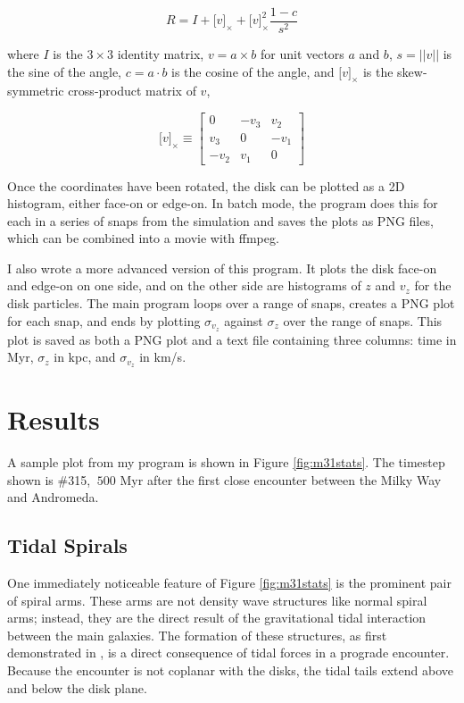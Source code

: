 \documentclass[iop]{emulateapj}
\begin{document}
\begin{equation}
R = I + {\lbrack v \rbrack}_\times + {\lbrack v \rbrack}_\times^2 \frac{1-c}{s^2}
\end{equation}

where $I$ is the $3\times3$ identity matrix, $v = a \times b$ for unit vectors $a$ and $b$, $s = ||v||$ is the sine of the angle, $c = a \cdot b$ is the cosine of the angle, and ${\lbrack v \rbrack}_\times$ is the skew-symmetric cross-product matrix of $v$,

\[
{\lbrack v \rbrack}_\times \equiv \left[ \begin{array}{ccc}
0 & -v_3 & v_2 \\
v_3 & 0 & -v_1 \\
-v_2 & v_1 & 0 \end{array} \right]
\]

Once the coordinates have been rotated, the disk can be plotted as a 2D histogram, either face-on or edge-on. In batch mode, the program does this for each in a series of snaps from the simulation and saves the plots as PNG files, which can be combined into a movie with ffmpeg.

I also wrote a more advanced version of this program. It plots the disk face-on and edge-on on one side, and on the other side are histograms of $z$ and $v_z$ for the disk particles. The main program loops over a range of snaps, creates a PNG plot for each snap, and ends by plotting $\sigma_{v_z}$ against $\sigma_z$ over the range of snaps. This plot is saved as both a PNG plot and a text file containing three columns: time in Myr, $\sigma_z$ in kpc, and $\sigma_{v_z}$ in km/s.

\section{Results}
A sample plot from my program is shown in Figure \ref{fig:m31stats}. The timestep shown is \#315, $~500$ Myr after the first close encounter between the Milky Way and Andromeda.

\subsection{Tidal Spirals}
One immediately noticeable feature of Figure \ref{fig:m31stats} is the prominent pair of spiral arms. These arms are not density wave structures like normal spiral arms; instead, they are the direct result of the gravitational tidal interaction between the main galaxies. The formation of these structures, as first demonstrated in \citet{Too72}, is a direct consequence of tidal forces in a prograde encounter. Because the encounter is not coplanar with the disks, the tidal tails extend above and below the disk plane.
\end{document}
